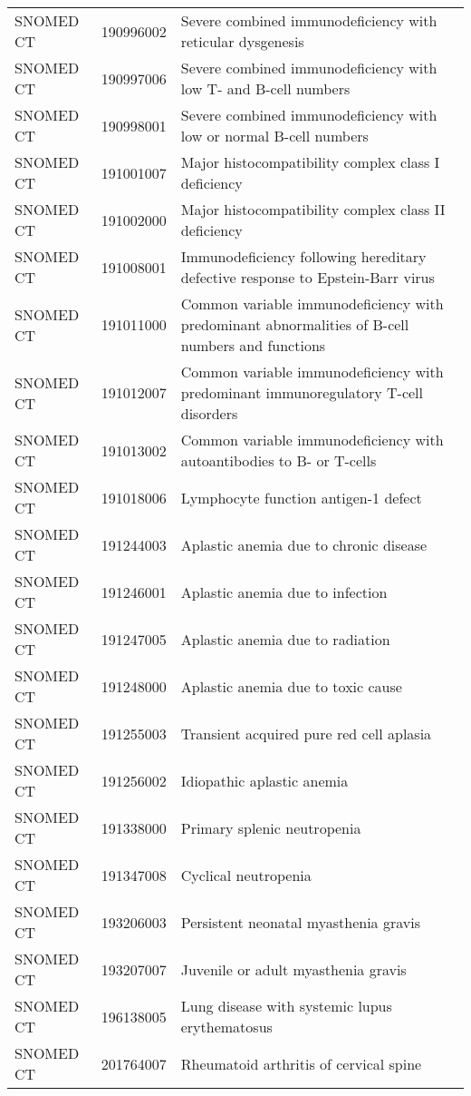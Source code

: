 \begin{table}[ht]
\begin{tabular}{lll}
  SNOMED CT & 190996002 & Severe combined immunodeficiency with reticular dysgenesis \\ 
  SNOMED CT & 190997006 & Severe combined immunodeficiency with low T- and B-cell numbers \\ 
  SNOMED CT & 190998001 & Severe combined immunodeficiency with low or normal B-cell numbers \\ 
  SNOMED CT & 191001007 & Major histocompatibility complex class I deficiency \\ 
  SNOMED CT & 191002000 & Major histocompatibility complex class II deficiency \\ 
  SNOMED CT & 191008001 & Immunodeficiency following hereditary defective response to Epstein-Barr virus \\ 
  SNOMED CT & 191011000 & Common variable immunodeficiency with predominant abnormalities of B-cell numbers and functions \\ 
  SNOMED CT & 191012007 & Common variable immunodeficiency with predominant immunoregulatory T-cell disorders \\ 
  SNOMED CT & 191013002 & Common variable immunodeficiency with autoantibodies to B- or T-cells \\ 
  SNOMED CT & 191018006 & Lymphocyte function antigen-1 defect \\ 
  SNOMED CT & 191244003 & Aplastic anemia due to chronic disease \\ 
  SNOMED CT & 191246001 & Aplastic anemia due to infection \\ 
  SNOMED CT & 191247005 & Aplastic anemia due to radiation \\ 
  SNOMED CT & 191248000 & Aplastic anemia due to toxic cause \\ 
  SNOMED CT & 191255003 & Transient acquired pure red cell aplasia \\ 
  SNOMED CT & 191256002 & Idiopathic aplastic anemia \\ 
  SNOMED CT & 191338000 & Primary splenic neutropenia \\ 
  SNOMED CT & 191347008 & Cyclical neutropenia \\ 
  SNOMED CT & 193206003 & Persistent neonatal myasthenia gravis \\ 
  SNOMED CT & 193207007 & Juvenile or adult myasthenia gravis \\ 
  SNOMED CT & 196138005 & Lung disease with systemic lupus erythematosus \\ 
  SNOMED CT & 201764007 & Rheumatoid arthritis of cervical spine \\ 

\end{tabular}
\end{table}
